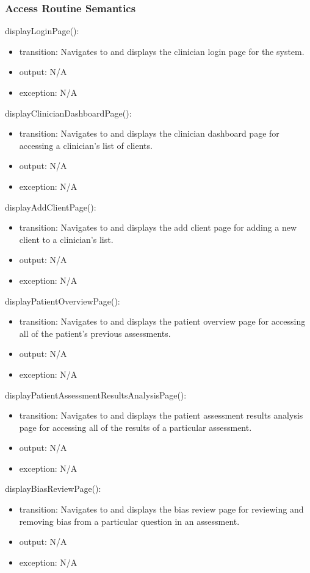 \documentclass[12pt, titlepage]{article}
\begin{document}
\subsubsection{Access Routine Semantics}

\noindent displayLoginPage():
\begin{itemize}
\item transition: Navigates to and displays the clinician login page for the system.
\item output: N/A
\item exception: N/A
\end{itemize}

\noindent displayClinicianDashboardPage():
\begin{itemize}
\item transition: Navigates to and displays the clinician dashboard page for accessing a clinician's list of clients.
\item output: N/A
\item exception: N/A
\end{itemize}

\noindent displayAddClientPage():
\begin{itemize}
\item transition: Navigates to and displays the add client page for adding a new client to a clinician's list.
\item output: N/A
\item exception: N/A
\end{itemize}

\noindent displayPatientOverviewPage():
\begin{itemize}
\item transition: Navigates to and displays the patient overview page for accessing all of the patient's previous assessments.
\item output: N/A
\item exception: N/A
\end{itemize}

\noindent displayPatientAssessmentResultsAnalysisPage():
\begin{itemize}
\item transition: Navigates to and displays the patient assessment results analysis page for accessing all of the results of a particular assessment.
\item output: N/A
\item exception: N/A
\end{itemize}

\noindent displayBiasReviewPage():
\begin{itemize}
\item transition: Navigates to and displays the bias review page for reviewing and removing bias from a particular question in an assessment.
\item output: N/A
\item exception: N/A
\end{itemize}
\end{document}
